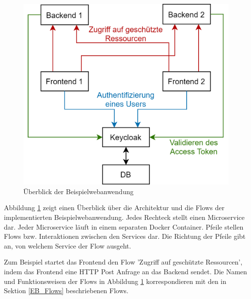 \begin{figure}[!ht]
	\centering
	\includegraphics[width=.8\textwidth]{Images/EbertScherer/ArchitectureDiagram.png}
	\caption{Überblick der Beispielwebanwendung}
	\label{fig:EB_Beispielwebanwendung Überblick}
\end{figure}

Abbildung \ref{fig:EB_Beispielwebanwendung Überblick} zeigt einen Überblick über die Architektur und die Flows der implementierten Beispielwebanwendung. Jedes Rechteck stellt einen Microservice dar. Jeder Microservice läuft in einem separaten Docker Container. Pfeile stellen Flows bzw. Interaktionen zwischen den Services dar. Die Richtung der Pfeile gibt an, von welchem Service der Flow ausgeht. 

Zum Beispiel startet das Frontend den Flow 'Zugriff auf geschützte Ressourcen', indem das Frontend eine HTTP Post Anfrage an das Backend sendet. Die Namen und Funktionsweisen der Flows in Abbildung \ref{fig:EB_Beispielwebanwendung Überblick} korrespondieren mit den in Sektion \ref{EB_Flows} beschriebenen Flows. 

